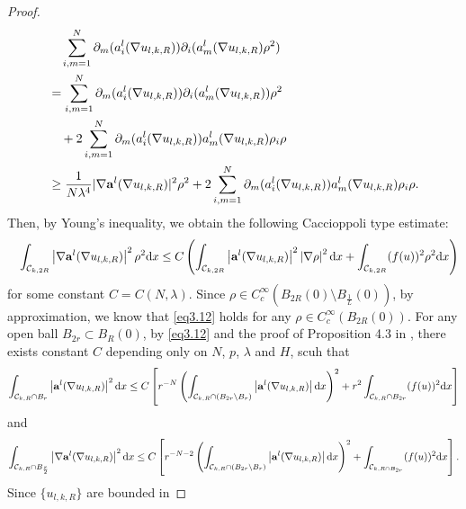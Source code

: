 \documentclass[12pt]{amsart}
\theoremstyle{definition}
\theoremstyle{remark}
\theoremstyle{conclusion}
\theoremstyle{conjecture}
\numberwithin{equation}{section}
\begin{document}
\begin{proof}
\begin{equation*}
\begin{aligned}
        &\quad \sum\limits_{i,m=1}^{N}\partial_m (a^l_i(\nabla u_{l,k,R}))\partial_i(a^l_m(\nabla u_{l,k,R})\rho^2) \\
        &=\sum\limits_{i,m=1}^{N}\partial_m (a^l_i(\nabla u_{l,k,R}))\partial_i (a^l_m(\nabla u_{l,k,R}))\rho^2\\
        &\quad +2\sum\limits_{i,m=1}^{N}\partial_m (a^l_i(\nabla u_{l,k,R}))a^l_m(\nabla u_{l,k,R})\rho_i\rho\\
        &\geq \frac{1}{N\lambda^4}|\nabla {\bf{a}}^l(\nabla u_{l,k,R})|^2\rho^2+2\sum\limits_{i,m=1}^{N}\partial_m (a^l_i(\nabla u_{l,k,R}))a^l_m(\nabla u_{l,k,R})\rho_i\rho.
    \end{aligned}
\end{equation*}
Then, by Young's inequality, we obtain the following Caccioppoli type estimate:
\begin{eqnarray}\label{eq3.12}
    \quad \int_{\mathcal{C}_{k,2R}}\left\lvert \nabla {\bf{a}}^l(\nabla u_{l,k,R})\right\rvert^2\rho^2\mathrm{d}x \leq C\left(\int_{\mathcal{C}_{k,2R}}\left\lvert {\bf{a}}^l(\nabla u_{l,k,R})\right\rvert^2\left\lvert\nabla\rho \right\rvert^2 \mathrm{d}x+
     \int_{\mathcal{C}_{k,2R}}(f(u))^2\rho^2\mathrm{d}x\right)
\end{eqnarray}
for some constant $C=C(N,\lambda)$. Since $ \rho \in C_c^{\infty}(B_{2R}(0)\setminus B_{\frac{1}{L}}(0))$, by approximation, we know that \eqref{eq3.12} holds for any  $\rho \in C_c^{\infty}(B_{2R}(0))$.  For any open ball  $B_{2r}\subset B_R(0)$, by \eqref{eq3.12} and the proof of Proposition 4.3 in \cite{ACF}, there exists constant $C$ depending only on $N$, $p$, $\lambda$ and $H$, scuh that
\begin{equation}\label{al1}
\int_{\mathcal{C}_{k,R}\cap B_r}\left\lvert {\bf{a}}^l(\nabla u_{l,k,R})\right\rvert^2\mathrm{d}x\leq C\left[r^{-N}\left(\int_{\mathcal{C}_{k,R}\cap (B_{2r}\backslash B_r) }\left\lvert {\bf{a}}^l(\nabla u_{l,k,R})\right\rvert\mathrm{d}x\right)^2+r^2\int_{\mathcal{C}_{k,R}\cap B_{2r}}(f(u))^2\mathrm{d}x \right]
\end{equation}
and
\begin{equation}\label{al2}
 \int_{\mathcal{C}_{k,R}\cap B_{\frac{r}{2}}}\left\lvert \nabla {\bf{a}}^l(\nabla u_{l,k,R})\right\rvert^2\mathrm{d}x\leq C\left[r^{-N-2}\left(\int_{\mathcal{C}_{k,R}\cap (B_{2r}\backslash B_r) }\left\lvert {\bf{a}}^l(\nabla u_{l,k,R})\right\rvert\mathrm{d}x\right)^2+\int_{\mathcal{C}_{k,R \cap B_{2r}}}(f(u))^2\mathrm{d}x \right].
\end{equation}
Since $\{u_{l,k,R}\}$ are bounded in

\end{proof}
\end{document}
